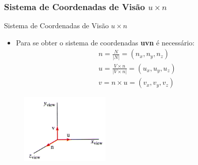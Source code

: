 \documentclass{beamer}
\begin{document}
\begin{frame}
\frametitle{Sistema de Coordenadas de Visão $u \times n$}
	\begin{block}{Sistema de Coordenadas de Visão $u \times n$}
		\begin{itemize}
			\item Para se obter o sistema de coordenadas \textbf{uvn} é necessário:
				\begin{eqnarray*}
					n = \frac{N}{|N|} = (n_x,n_y,n_z) \\
					u = \frac{V \times n}{|V \times n|} = (u_x,u_y,u_z) \\
					v = n \times u = (v_x,v_y,v_z)
				\end{eqnarray*}
		\end{itemize}
	\end{block}
	
	\begin{figure}[!h]
			\begin{center}
			\includegraphics[width=0.38\textwidth]{Figures/uvn}
			\end{center}
	\end{figure}
\end{frame}
\end{document}
